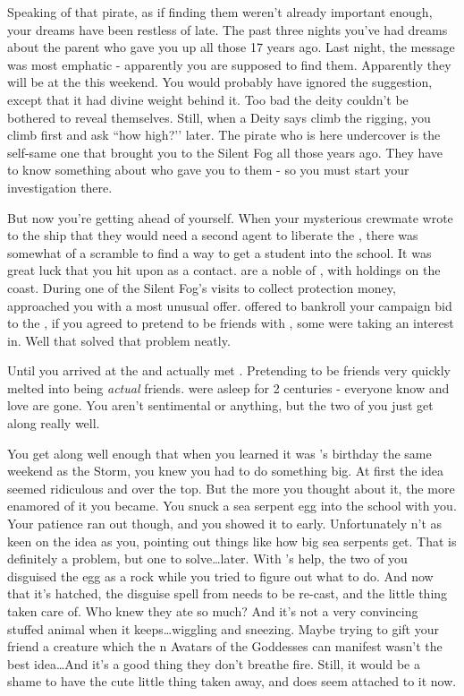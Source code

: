 \documentclass[char]{GL2020}
\begin{document}
Speaking of that pirate, as if finding them weren’t already important enough, your dreams have been restless of late. The past three nights you’ve had dreams about the parent who gave you up all those 17 years ago. Last night, the message was most emphatic - apparently you are supposed to find them. Apparently they will be at the \pSc{} this weekend. You would probably have ignored the suggestion, except that it had divine weight behind it. Too bad the deity couldn’t be bothered to reveal themselves. Still, when a Deity says climb the rigging, you climb first and ask ``how high?’’ later. The pirate who is here undercover is the self-same one that brought you to the Silent Fog all those years ago. They have to know something about who gave you to them - so you must start your investigation there.

But now you’re getting ahead of yourself. When your mysterious crewmate wrote to the ship that they would need a second agent to liberate the \iNet{}, there was somewhat of a scramble to find a way to get a student into the school. It was great luck that you hit upon \cWildCard{} as a contact. \cWildCard{\They} are a noble\cWildCard{\person} of \pFarm{}, with holdings on the coast. During one of the Silent Fog’s visits to collect protection money, \cWildCard{} approached you with a most unusual offer. \cWildCard{\They} offered to bankroll your campaign bid to the \pSchool{}, if you agreed to pretend to be friends with \cDisney{}, some \cDisney{\kid} \cWildCard{\they} were taking an interest in. Well that solved that problem neatly.

Until you arrived at the \pSchool{} and actually met \cDisney{}. Pretending to be friends very quickly melted into being \emph{actual} friends. \cDisney{\They} were asleep for 2 centuries - everyone \cDisney{\they} know and love are gone. You aren’t sentimental or anything, but the two of you just get along really well.

You get along well enough that when you learned it was \cDisney{}’s birthday the same weekend as the Storm, you knew you had to do something big. At first the idea seemed ridiculous and over the top. But the more you thought about it, the more enamored of it you became. You snuck a sea serpent egg into the school with you. Your patience ran out though, and you showed it to \cDisney{} early. Unfortunately \cDisney{\they} n’t as keen on the idea as you, pointing out things like how big sea serpents get. That is definitely a problem, but one to solve\ldots later. With \cAdopted{}’s help, the two of you disguised the egg as a rock while you tried to figure out what to do. And now that it’s hatched, the disguise spell from \cAdopted{} needs to be re-cast, and the little thing taken care of. Who knew they ate so much? And it’s not a very convincing stuffed animal when it keeps\ldots wiggling and sneezing. Maybe trying to gift your friend a creature which the \pEarth{}n Avatars of the Goddesses can manifest wasn’t the best idea\ldots And it’s a good thing they don’t breathe fire. Still, it would be a shame to have the cute little thing taken away, and \cDisney{} does seem attached to it now.
\end{document}

